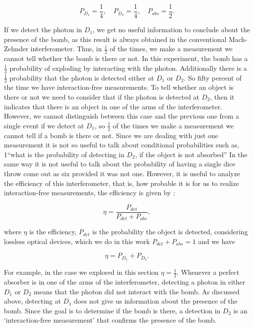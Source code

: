 \documentclass[12pt]{book}
\begin{document}
\begin{equation}
P_{D_{1}}=\frac{1}{4},\quad P_{D_{2}}=\frac{1}{4}, \quad P_{abs}=\frac{1}{2}.
\end{equation}



If we detect the photon in $D_{1}$, we get no useful information to conclude about the presence of the bomb, as this result is always obtained in the conventional Mach-Zehnder interferometer. Thus, in $\frac{1}{2}$ of the times, we make a measurement we cannot tell whether the bomb is there or not. In this experiment, the bomb has a $\frac{1}{2}$ probability of exploding by interacting with the photon. Additionally there is a $\frac{1}{2}$ probability that the photon is detected either at $D_{1}$ or $D_{2}$. So fifty percent of the time we have interaction-free measurements. To tell whether an object is there or not we need to consider that if the photon is detected at $D_{2}$, then it indicates that there is an object in one of the arms of the interferometer. However, we cannot distinguish between this case and the previous one from a single event if we detect at $D_{1}$, so $\frac{1}{2}$ of the times we make a measurement we cannot tell if a bomb is there or not. Since we are dealing with just one measurement it is not so useful to talk about conditional probabilities such as, 1``what is the probability of detecting in $D_{2}$, if the object is not absorbed'' In the same way it is not useful to talk about the probability of having a single dice throw come out as six provided it was not one. However, it is useful to analyze the efficiency of this interferometer, that is, how probable it is for us to realize interaction-free measurements, the efficiency is given by \cite{5}:

\begin{equation}
\eta=\frac{P_{det}}{P_{det}+P_{abs}},
\end{equation}

where $\eta$ is the efficiency, $P_{det}$ is the probability the object is detected, considering lossless optical devices, which we do in this work $P_{det}+P_{abs}=1$ and we have

\begin{equation}
\eta=P_{D_{1}}+P_{D_{2}}.
\end{equation}

For example, in the case we explored in this section $\eta=\frac{1}{2}$.  Whenever a perfect absorber is in one of the arms of the interferometer, detecting a photon in either $D_1$ or $D_2$ means that the photon did not interact with the bomb. As discussed above, detecting at $D_1$ does not give us information about the presence of the bomb. Since the goal is to determine if the bomb is there, a detection in $D_2$ is an ‘interaction-free measurement’ that confirms the presence of the bomb.
  
\end{document}
